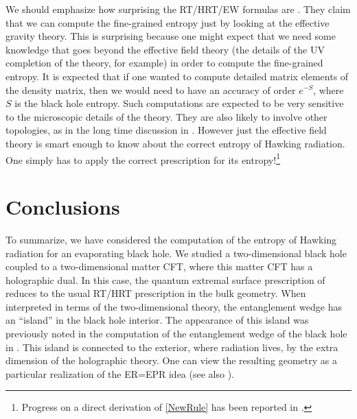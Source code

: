\documentclass[12pt]{article}
\begin{document}
We should emphasize how surprising the RT/HRT/EW formulas are \cite{Ryu:2006bv, Hubeny:2007xt, Engelhardt:2014gca}. 
They claim that we can compute the fine-grained entropy just by looking at the effective gravity theory.
This is surprising because one might expect that we need some knowledge that goes beyond the effective field theory (the details of the UV completion of the theory, for example) in order to compute the fine-grained entropy.
It is expected that if one wanted to compute detailed matrix elements of the density matrix, then we would need to have an accuracy of order $e^{-S}$, where $S$ is the black hole entropy. 
Such computations are expected to be very sensitive to the microscopic details of the theory. They are also  likely to involve other topologies, as in the long time discussion in \cite{Saad:2018bqo,Saad:2019lba}.
However just the effective field theory is smart enough to know about the correct entropy of Hawking radiation. 
One simply has to apply the correct prescription for its entropy!\footnote{Progress on a direct derivation of \eqref{NewRule} has been reported in \cite{PeningtonWIP,AlmheiriWIP}. }


\section{Conclusions}
\label{sec:conclude}

To summarize,
we have considered the computation of the entropy of Hawking radiation for an evaporating black hole. 
We studied a two-dimensional black hole coupled to a two-dimensional matter CFT, where this matter CFT has a holographic dual. 
In this case, the quantum extremal surface prescription of \cite{Engelhardt:2014gca} reduces to the usual RT/HRT \cite{Ryu:2006bv,Hubeny:2007xt} prescription in the bulk geometry.
When interpreted in terms of the two-dimensional theory, the entanglement wedge has an ``island'' in the black hole interior. 
The appearance of this island was previously noted in the computation of the entanglement wedge of the black hole in \cite{Penington:2019npb,Almheiri:2019psf}. 
This island is connected to the exterior, where radiation lives, by the extra dimension of the holographic theory. 
One can view the resulting geometry as a particular realization of the ER=EPR \cite{Maldacena:2013xja, Maldacena:2013t1} idea (see also \cite{Susskind:2012uw, Papadodimas:2012aq}). 
\end{document}
